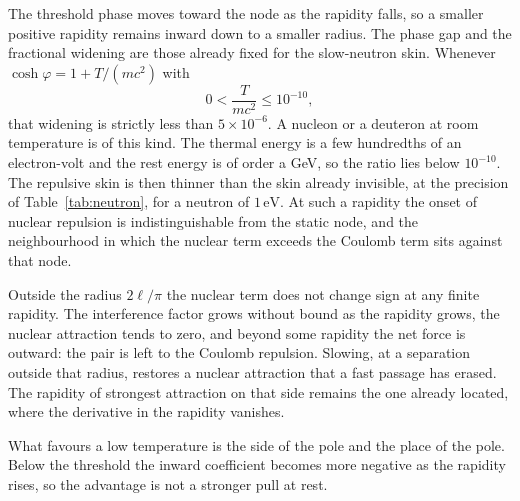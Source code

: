 \documentclass[a4paper]{article}
\begin{document}
The threshold phase moves toward the node as the rapidity falls, so a smaller positive rapidity remains inward down to a smaller radius. The phase gap and the fractional widening are those already fixed for the slow-neutron skin. Whenever \(\cosh\varphi=1+T/(mc^{2})\) with
\[
0<\frac{T}{mc^{2}}\le 10^{-10},
\]
that widening is strictly less than \(5\times 10^{-6}\). A nucleon or a deuteron at room temperature is of this kind. The thermal energy is a few hundredths of an electron-volt and the rest energy is of order a GeV, so the ratio lies below \(10^{-10}\). The repulsive skin is then thinner than the skin already invisible, at the precision of Table~\ref{tab:neutron}, for a neutron of \(1\,\mathrm{eV}\). At such a rapidity the onset of nuclear repulsion is indistinguishable from the static node, and the neighbourhood in which the nuclear term exceeds the Coulomb term sits against that node.

Outside the radius \(2\ell/\pi\) the nuclear term does not change sign at any finite rapidity. The interference factor grows without bound as the rapidity grows, the nuclear attraction tends to zero, and beyond some rapidity the net force is outward: the pair is left to the Coulomb repulsion. Slowing, at a separation outside that radius, restores a nuclear attraction that a fast passage has erased. The rapidity of strongest attraction on that side remains the one already located, where the derivative in the rapidity vanishes.

What favours a low temperature is the side of the pole and the place of the pole. Below the threshold the inward coefficient becomes more negative as the rapidity rises, so the advantage is not a stronger pull at rest.
\end{document}
